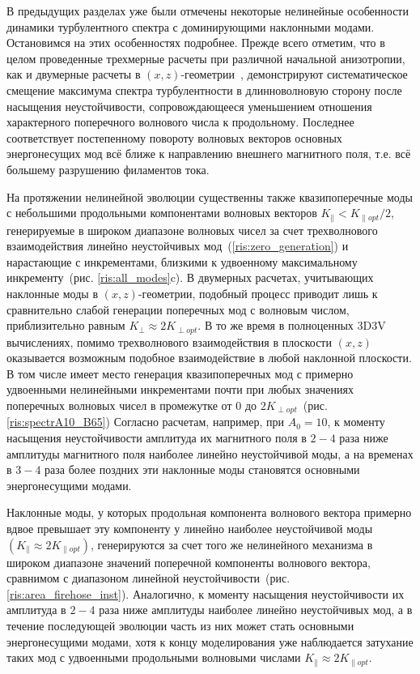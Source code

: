 В предыдущих разделах уже были отмечены некоторые нелинейные особенности динамики турбулентного спектра с доминирующими наклонными модами. Остановимся на этих особенностях подробнее. Прежде всего отметим, что в целом проведенные трехмерные расчеты при различной начальной анизотропии, как и двумерные расчеты в $(x,z)$-геометрии~\cite{Camporeale2008,Hellinger2014}, демонстрируют систематическое смещение максимума спектра турбулентности в длинноволновую сторону после насыщения неустойчивости, сопровождающееся уменьшением отношения характерного поперечного волнового числа к продольному. Последнее соответствует постепенному повороту волновых векторов основных энергонесущих мод всё ближе к направлению внешнего магнитного поля, т.е. всё большему разрушению филаментов тока.

На протяжении нелинейной эволюции существенны также квазипоперечные моды с небольшими продольными компонентами волновых векторов $K_\|<K_{\|opt}/2$, генерируемые в широком диапазоне волновых чисел за счет трехволнового взаимодействия линейно неустойчивых мод~(\ref{ris:zero_generation}) 
и нарастающие с инкрементами, близкими к удвоенному максимальному инкременту~(рис. \ref{ris:all_modes}c). В двумерных расчетах, учитывающих наклонные моды в $(x,z)$-геометрии, подобный процесс приводит лишь к сравнительно слабой генерации поперечных мод с волновым числом, приблизительно равным $K_\perp\approx2K_{\perp opt}$. В то же время в полноценных 3D3V вычислениях, помимо трехволнового взаимодействия в плоскости $(x,z)$ оказывается возможным подобное взаимодействие в любой наклонной плоскости. В том числе имеет место генерация квазипоперечных мод с примерно удвоенными нелинейными инкрементами почти при любых значениях поперечных волновых чисел в промежутке от $0$ до $2K_{\perp opt}$~(рис. \ref{ris:spectrA10_B65})
Согласно расчетам, например, при $A_0=10$, к моменту насыщения неустойчивости амплитуда их магнитного поля в $2-4$ раза ниже амплитуды магнитного поля наиболее линейно неустойчивой моды, а на временах в $3-4$ раза более поздних эти наклонные моды становятся основными энергонесущими модами.

Наклонные моды, у которых продольная компонента волнового вектора примерно вдвое превышает эту компоненту у линейно наиболее неустойчивой моды $\left(K_\|\approx2K_{\|opt}\right)$, генерируются за счет того же нелинейного механизма в широком диапазоне значений поперечной компоненты волнового вектора, сравнимом с диапазоном линейной неустойчивости~(рис. \ref{ris:area_firehose_inst}). 
Аналогично, к моменту насыщения неустойчивости их амплитуда в $2-4$ раза ниже амплитуды наиболее линейно неустойчивых мод, а в течение последующей эволюции часть из них может стать основными энергонесущими модами, хотя к концу моделирования уже наблюдается затухание таких мод с удвоенными продольными волновыми числами $K_\|\approx2K_{\|opt}$. 

